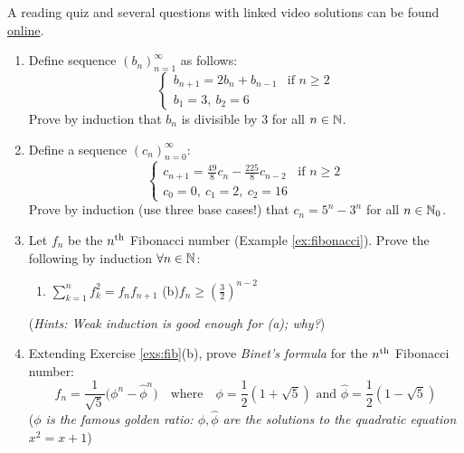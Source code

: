 \begin{exercises}{}{}
	A reading quiz and several questions with linked video solutions can be found \href{http://www.math.uci.edu/~ndonalds/math13/selftest/5-3-strongind.html}{online}.

	\begin{enumerate}  
  	\item Define sequence $(b_n)_{n=1}^\infty$ as follows:
  	\[
  		\begin{cases}
				b_{n+1}=2b_n+b_{n-1} &\text{if } n\ge 2\\
				b_1=3, \ b_2=6
			\end{cases}
		\]
		Prove by induction that $b_n$ is divisible by 3 for all $n\in\mathbb{N}$.
	
	
		\item\label{ex:ind3strong} Define a sequence $(c_n)_{n=0}^\infty$:
	 	\[
	 		\begin{cases}
				c_{n+1}=\frac{49}8c_n-\frac{225}8c_{n-2}&\text{if }n\ge 2\\
				c_0=0, \ c_1=2, \ c_2=16
			\end{cases}
		\]
		Prove by induction (use three base cases!) that $c_n=5^n-3^n$ for all $n\in\mathbb{N}_0$.
		
		
		\item\label{exs:fib} Let $f_n$ be the $n\textsuperscript{th}$ Fibonacci number (Example \ref{ex:fibonacci}). Prove the following by induction $\forall n\in\mathbb{N}$:
		\begin{enumerate}
		  \item $\sum\limits_{k=1}^nf_k^2=f_nf_{n+1}$ \qquad\qquad (b)\lstsp $f_n\ge\left(\frac 32\right)^{n-2}$
		\end{enumerate}
		(\emph{Hints: Weak induction is good enough for (a); why?})
	
	
		\goodbreak
		

	  \item\label{exs:fib2} Extending Exercise \ref{exs:fib}(b), prove \emph{Binet's formula} for the $n\textsuperscript{th}$ Fibonacci number:
	  \[
	  	f_n=\frac 1{\sqrt 5}\bigl(\phi^n-\hat\phi^n\bigr) \quad \text{where}\quad \phi=\frac 12(1+\sqrt{5})\text{ and } \hat\phi=\frac 12(1-\sqrt{5})
	  \]
		(\emph{$\phi$ is the famous \emph{golden ratio}: $\phi,\hat\phi$ are the solutions to the quadratic equation $x^2=x+1$})
  
%   
	

\end{enumerate}
\end{exercises}
